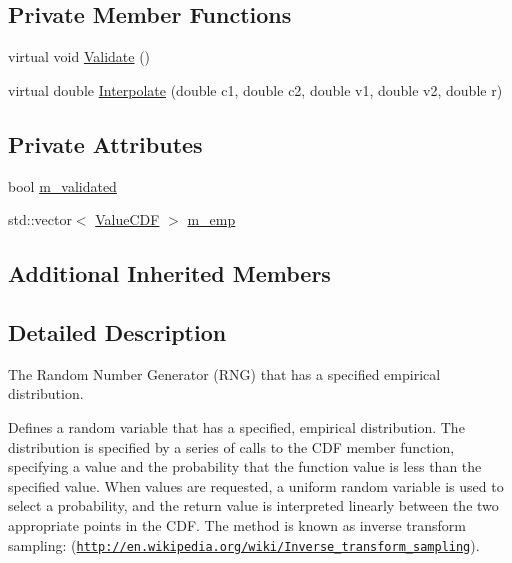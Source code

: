 \subsection*{Private Member Functions}
\begin{DoxyCompactItemize}
\item 
virtual void \hyperlink{classns3_1_1EmpiricalRandomVariable_aacabb8ee16c8f172683052abd7a1f8cd}{Validate} ()
\item 
virtual double \hyperlink{classns3_1_1EmpiricalRandomVariable_a8e0a52a108ccb100a56e380c4b2ab102}{Interpolate} (double c1, double c2, double v1, double v2, double r)
\end{DoxyCompactItemize}
\subsection*{Private Attributes}
\begin{DoxyCompactItemize}
\item 
bool \hyperlink{classns3_1_1EmpiricalRandomVariable_aa3038da76db39faac73ceb5445791205}{m\+\_\+validated}
\item 
std\+::vector$<$ \hyperlink{classns3_1_1EmpiricalRandomVariable_1_1ValueCDF}{Value\+C\+DF} $>$ \hyperlink{classns3_1_1EmpiricalRandomVariable_aab4864cc028da8bb0c4bd8cfdd723fc7}{m\+\_\+emp}
\end{DoxyCompactItemize}
\subsection*{Additional Inherited Members}


\subsection{Detailed Description}
The Random Number Generator (R\+NG) that has a specified empirical distribution. 

Defines a random variable that has a specified, empirical distribution. The distribution is specified by a series of calls to the C\+DF member function, specifying a value and the probability that the function value is less than the specified value. When values are requested, a uniform random variable is used to select a probability, and the return value is interpreted linearly between the two appropriate points in the C\+DF. The method is known as inverse transform sampling\+: (\href{http://en.wikipedia.org/wiki/Inverse_transform_sampling}{\tt http\+://en.\+wikipedia.\+org/wiki/\+Inverse\+\_\+transform\+\_\+sampling}).

